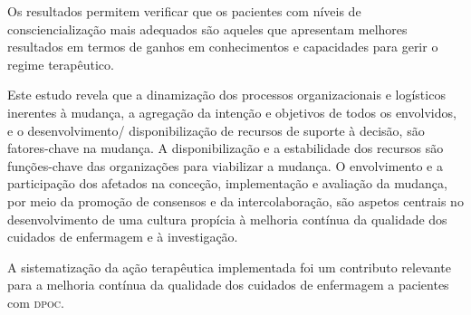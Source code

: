 \documentclass{article}
\begin{document}
Os resultados permitem verificar que os pacientes com níveis de
consciencialização mais adequados são aqueles que apresentam melhores resultados
em termos de ganhos em conhecimentos e capacidades para gerir o regime
terapêutico.

Este estudo revela que a dinamização dos processos organizacionais e logísticos
inerentes à mudança, a agregação da intenção e objetivos de todos os envolvidos,
e o desenvolvimento/ disponibilização de recursos de suporte à decisão, são
fatores-chave na mudança. A disponibilização e a estabilidade dos recursos são
funções-chave das organizações para viabilizar a mudança. O envolvimento e a
participação dos afetados na conceção, implementação e avaliação da mudança, por
meio da promoção de consensos e da intercolaboração, são aspetos centrais no
desenvolvimento de uma cultura propícia à melhoria contínua da qualidade dos
cuidados de enfermagem e à investigação.

A sistematização da ação terapêutica implementada foi um contributo relevante
para a melhoria contínua da qualidade dos cuidados de enfermagem a pacientes com
\textsc{dpoc}.
\end{document}
